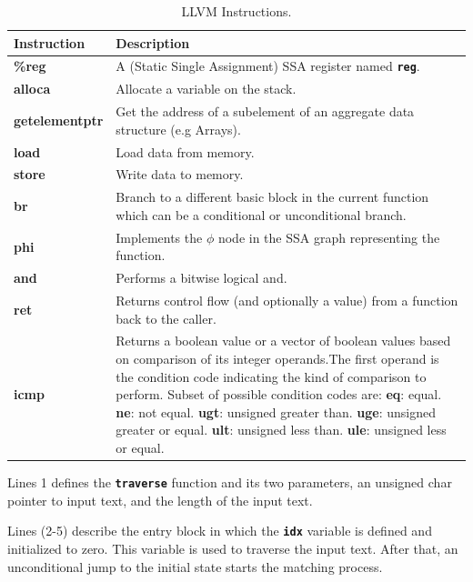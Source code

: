 {\renewcommand{\arraystretch}{1.5}%
\begin{table}[H]
\centering
\small
\begin{tabularx}{\textwidth}{|l|X|}
\hline
Instruction        & Description  \\
\hline
\textbf{\%reg} & A (Static Single Assignment) SSA register named \texttt{\textbf{reg}}.\\
\hline
\textbf{alloca} & Allocate a variable on the stack.\\
\hline
\textbf{getelementptr} & Get the address of a subelement of an aggregate data structure (e.g Arrays).\\
\hline
\textbf{load} & Load data from memory.\\
\hline
\textbf{store} & Write data to memory.\\
\hline
\textbf{br} & Branch to a different basic block in the current function which can be a conditional or unconditional branch. \\
\hline
\textbf{phi} & Implements the $\phi$ node in the SSA graph representing the function.\\
\hline
\textbf{and} & Performs a bitwise logical and.\\
\hline
\textbf{ret} & Returns control flow (and optionally a value) from a function back to the caller.\\
\hline
\textbf{icmp} &
Returns a boolean value or a vector of boolean values based on comparison of its integer operands.The first operand is the condition code indicating the kind of comparison to perform. Subset of possible condition codes are:\newline
\textbf{eq}: equal. \textbf{ne}: not equal. \textbf{ugt}: unsigned greater than.
\textbf{uge}: unsigned greater or equal. \textbf{ult}: unsigned less than. \textbf{ule}: unsigned less or equal.\\
\hline
\end{tabularx}
\caption[LLVM Instructions]{LLVM Instructions.}\label{tab:llvminst}
\end{table}}

Lines 1 defines the \texttt{\textbf{traverse}} function and its two parameters, an unsigned char pointer to input text, and the length of the input text.

Lines (2-5) describe the entry block in which the \texttt{\textbf{idx}} variable is defined and initialized to zero. This variable is used to traverse the input text. After that, an unconditional jump to the initial state starts the matching process.


